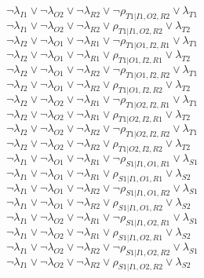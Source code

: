 $\neg\lambda_{I1} \vee \neg\lambda_{O2} \vee \neg\lambda_{R2} \vee \neg\rho_{T1|I1,O2,R2} \vee \lambda_{T1}$\\
$\neg\lambda_{I1} \vee \neg\lambda_{O2} \vee \neg\lambda_{R2} \vee \rho_{T1|I1,O2,R2} \vee \lambda_{T2}$\\
$\neg\lambda_{I2} \vee \neg\lambda_{O1} \vee \neg\lambda_{R1} \vee \neg\rho_{T1|O1,I2,R1} \vee \lambda_{T1}$\\
$\neg\lambda_{I2} \vee \neg\lambda_{O1} \vee \neg\lambda_{R1} \vee \rho_{T1|O1,I2,R1} \vee \lambda_{T2}$\\
$\neg\lambda_{I2} \vee \neg\lambda_{O1} \vee \neg\lambda_{R2} \vee \neg\rho_{T1|O1,I2,R2} \vee \lambda_{T1}$\\
$\neg\lambda_{I2} \vee \neg\lambda_{O1} \vee \neg\lambda_{R2} \vee \rho_{T1|O1,I2,R2} \vee \lambda_{T2}$\\
$\neg\lambda_{I2} \vee \neg\lambda_{O2} \vee \neg\lambda_{R1} \vee \neg\rho_{T1|O2,I2,R1} \vee \lambda_{T1}$\\
$\neg\lambda_{I2} \vee \neg\lambda_{O2} \vee \neg\lambda_{R1} \vee \rho_{T1|O2,I2,R1} \vee \lambda_{T2}$\\
$\neg\lambda_{I2} \vee \neg\lambda_{O2} \vee \neg\lambda_{R2} \vee \neg\rho_{T1|O2,I2,R2} \vee \lambda_{T1}$\\
$\neg\lambda_{I2} \vee \neg\lambda_{O2} \vee \neg\lambda_{R2} \vee \rho_{T1|O2,I2,R2} \vee \lambda_{T2}$\\
$\neg\lambda_{I1} \vee \neg\lambda_{O1} \vee \neg\lambda_{R1} \vee \neg\rho_{S1|I1,O1,R1} \vee \lambda_{S1}$\\
$\neg\lambda_{I1} \vee \neg\lambda_{O1} \vee \neg\lambda_{R1} \vee \rho_{S1|I1,O1,R1} \vee \lambda_{S2}$\\
$\neg\lambda_{I1} \vee \neg\lambda_{O1} \vee \neg\lambda_{R2} \vee \neg\rho_{S1|I1,O1,R2} \vee \lambda_{S1}$\\
$\neg\lambda_{I1} \vee \neg\lambda_{O1} \vee \neg\lambda_{R2} \vee \rho_{S1|I1,O1,R2} \vee \lambda_{S2}$\\
$\neg\lambda_{I1} \vee \neg\lambda_{O2} \vee \neg\lambda_{R1} \vee \neg\rho_{S1|I1,O2,R1} \vee \lambda_{S1}$\\
$\neg\lambda_{I1} \vee \neg\lambda_{O2} \vee \neg\lambda_{R1} \vee \rho_{S1|I1,O2,R1} \vee \lambda_{S2}$\\
$\neg\lambda_{I1} \vee \neg\lambda_{O2} \vee \neg\lambda_{R2} \vee \neg\rho_{S1|I1,O2,R2} \vee \lambda_{S1}$\\
$\neg\lambda_{I1} \vee \neg\lambda_{O2} \vee \neg\lambda_{R2} \vee \rho_{S1|I1,O2,R2} \vee \lambda_{S2}$\\
